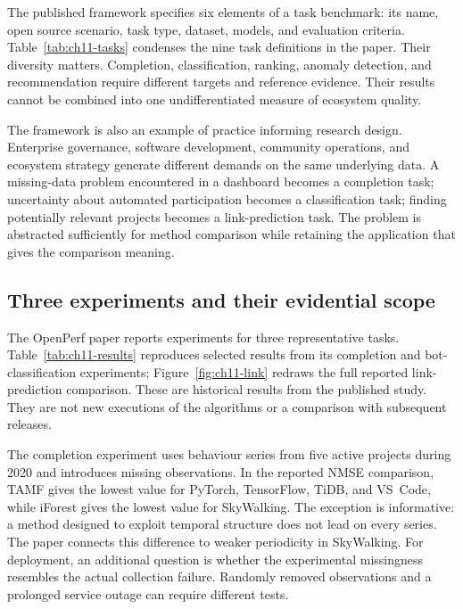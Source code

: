 The published framework specifies six elements of a task benchmark: its name, open source scenario, task type, dataset, models, and evaluation criteria. Table~\ref{tab:ch11-tasks} condenses the nine task definitions in the paper. Their diversity matters. Completion, classification, ranking, anomaly detection, and recommendation require different targets and reference evidence. Their results cannot be combined into one undifferentiated measure of ecosystem quality.



The framework is also an example of practice informing research design. Enterprise governance, software development, community operations, and ecosystem strategy generate different demands on the same underlying data. A missing-data problem encountered in a dashboard becomes a completion task; uncertainty about automated participation becomes a classification task; finding potentially relevant projects becomes a link-prediction task. The problem is abstracted sufficiently for method comparison while retaining the application that gives the comparison meaning.

\subsection{Three experiments and their evidential scope}
The OpenPerf paper reports experiments for three representative tasks. Table~\ref{tab:ch11-results} reproduces selected results from its completion and bot-classification experiments; Figure~\ref{fig:ch11-link} redraws the full reported link-prediction comparison. These are historical results from the published study. They are not new executions of the algorithms or a comparison with subsequent releases.



The completion experiment uses behaviour series from five active projects during 2020 and introduces missing observations. In the reported NMSE comparison, TAMF gives the lowest value for PyTorch, TensorFlow, TiDB, and VS~Code, while iForest gives the lowest value for SkyWalking. The exception is informative: a method designed to exploit temporal structure does not lead on every series. The paper connects this difference to weaker periodicity in SkyWalking. For deployment, an additional question is whether the experimental missingness resembles the actual collection failure. Randomly removed observations and a prolonged service outage can require different tests.


